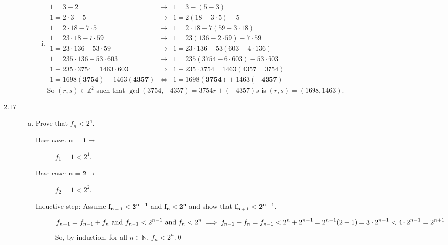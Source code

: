 \documentclass{article}
\begin{document}
\begin{description}
\begin{enumerate}[(a)]
\begin{enumerate}[(i)]
					
					\item$\begin{array}{ccc}
					1=3-2&\to  &1=3-(5-3)  \\ 
					1=2\cdot3-5&  \to&  1=2(18-3\cdot5)-5\\ 
					1=2\cdot18-7\cdot5&\to  &  1=2\cdot18-7(59-3\cdot18)\\ 
					1=23\cdot18-7\cdot59& \to &  1=23(136-2\cdot59)-7\cdot59\\ 
					1=23\cdot136-53\cdot59&\to  & 1=23\cdot136-53(603-4\cdot136) \\ 
					1=235\cdot136-53\cdot603& \to &1=235(3754-6\cdot603)-53\cdot603  \\ 
					1=235\cdot3754-1463\cdot603& \to &1=235\cdot3754-1463(4357-3754)  \\ 
					1=1698(\mathbf{3754})-1463(\mathbf{4357})& \iff & 1=1698(\mathbf{3754})+1463(\mathbf{-4357})
					\end{array}  $ \\ So $(r,s)\in\mathbb{Z}^2$ such that $\gcd(3754,-4357)=3754r+(-4357)s$ is $(r,s)=(1698,1463)$.  
				\end{enumerate}		
			
			\end{enumerate}
		\item[2.17]
		\begin{enumerate}[(a)]
			\item Prove that $f_n<2^n$.
			\begin{description}
				\item[Base case: $\mathbf{n=1}\to$] $f_1=1<2^1$. \checkmark
				\item[Base case: $\mathbf{n=2}\to$] $f_2=1<2^2$. \checkmark 
				\item[Inductive step: Assume $\mathbf{f_{n-1}<2^{n-1}}$ and $\mathbf{f_n<2^n}$ and show that $\mathbf{f_{n+1}<2^{n+1}}$.]
				\begin{dmath*}
					{f_{n+1}=f_{n-1}+f_n\text{ and } f_{n-1}<2^{n-1}\text{ and }f_n<2^n} \\ \implies {f_{n-1}+f_n=f_{n+1}}<2^n+2^{n-1}=2^{n-1}(2+1)=3\cdot2^{n-1}<4\cdot 2^{n-1}=2^{n+1}
				\end{dmath*} So, by induction, for all $n\in\mathbb{N}$, $f_n<2^n$.\qed
			\end{description}
			

\end{enumerate}
\end{description}
\end{document}

